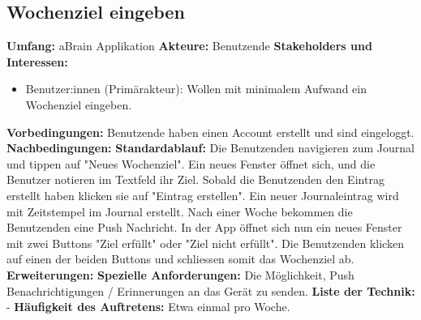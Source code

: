 \subsection{ Wochenziel eingeben }
\textbf{Umfang:} aBrain Applikation \newline \newline
\textbf{Akteure:} Benutzende \newline \newline
\textbf{Stakeholders und Interessen:}  
\begin{itemize}
	\item Benutzer:innen (Primärakteur): Wollen mit minimalem Aufwand ein Wochenziel eingeben.
\end{itemize}
\textbf{Vorbedingungen:}  Benutzende haben einen Account erstellt und sind eingeloggt. \newline \newline
\textbf{Nachbedingungen:} \newline \newline
\textbf{Standardablauf:} Die Benutzenden navigieren zum Journal und tippen auf "Neues Wochenziel". Ein neues Fenster öffnet sich, und die Benutzer notieren im Textfeld ihr Ziel. Sobald die Benutzenden den Eintrag erstellt haben klicken sie auf "Eintrag erstellen". Ein neuer Journaleintrag wird mit Zeitstempel im Journal erstellt. Nach einer Woche bekommen die Benutzenden eine Push Nachricht. In der App öffnet sich nun ein neues Fenster mit zwei Buttons "Ziel erfüllt" oder "Ziel nicht erfüllt". Die Benutzenden klicken auf einen der beiden Buttons und schliessen somit das Wochenziel ab. \newline \newline
\textbf{Erweiterungen:} \newline \newline
\textbf{Spezielle Anforderungen:} Die Möglichkeit, Push Benachrichtigungen / Erinnerungen an das Gerät zu senden. \newline \newline
\textbf{Liste der Technik:} - \newline \newline
\textbf{Häufigkeit des Auftretens:} Etwa einmal pro Woche. \newline \newline